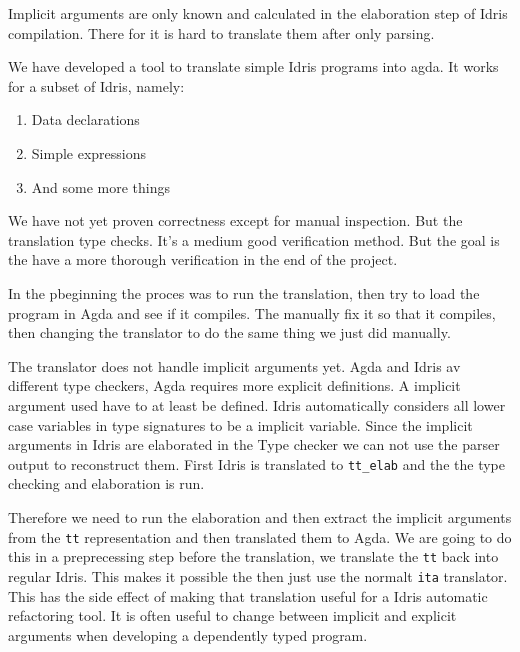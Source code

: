 \documentclass[parskip=half]{scrartcl}
\begin{document}
Implicit arguments are only known and calculated in the elaboration step of
Idris compilation. There for it is hard to translate them after only parsing.

%
We have developed a tool to translate simple Idris programs into agda. It works
for a subset of Idris, namely:

\begin{enumerate}
  \item Data declarations
  \item Simple expressions
  \item And some more things
\end{enumerate}

We have not yet proven correctness except for manual inspection.
But the translation type checks. It's a medium good verification method. But the
goal is the have a more thorough verification in the end of the project.

In the pbeginning the proces was to run the translation, then try to load the
program in Agda and see if it compiles. The manually fix it so that it
compiles, then changing the translator to do the same thing we just did
manually. %

The translator does not handle implicit arguments yet. Agda and Idris av
different type checkers, Agda requires more explicit definitions. A implicit
argument used have to at least be defined. Idris automatically considers all
lower case variables in type signatures to be a implicit variable. Since the
implicit arguments in Idris are elaborated in the Type checker we can not use
the parser output to reconstruct them. First Idris is translated to
\texttt{tt\_elab} and the the type checking and elaboration is run.

Therefore we need to run the elaboration and then extract the implicit
arguments from the \texttt{tt} representation and then translated them to Agda.
We are going to do this in a preprecessing step before the translation, we
translate the \texttt{tt} back into regular Idris. This makes it possible the
then just use the normalt \texttt{ita} translator. This has the side effect of
making that translation useful for a Idris automatic refactoring tool. It is
often useful to change between implicit and explicit arguments when developing
a dependently typed program.

\end{document}
